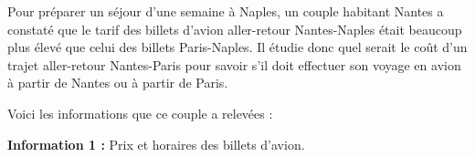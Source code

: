 \documentclass[10pt]{article}
\begin{document}
\setlength\parindent{0mm}
\pagestyle{fancy}
\thispagestyle{empty}
    
    
    




\medskip 

Pour préparer un séjour d'une semaine à Naples, un couple habitant Nantes a constaté que le tarif des billets d'avion aller-retour Nantes-Naples était beaucoup plus élevé que celui des billets Paris-Naples. Il étudie donc quel serait le coût d'un trajet aller-retour Nantes-Paris pour savoir s'il doit effectuer son voyage en 
avion à partir de Nantes ou à partir de Paris.
 
Voici les informations que ce couple a relevées :

\medskip
 
\textbf{Information 1 :}  Prix et horaires des billets d'avion.

\medskip
\end{document}
